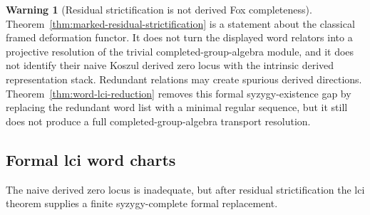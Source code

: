 \documentclass[11pt]{article}
\theoremstyle{definition}
\newtheorem{warning}[theorem]{Warning}
\begin{document}
\begin{warning}[Residual strictification is not derived Fox completeness]\label{warn:q2-marked-not-resolution}
Theorem~\ref{thm:marked-residual-strictification} is a statement about the classical framed deformation functor.  It does not turn the displayed word relators into a projective resolution of the trivial completed-group-algebra module, and it does not identify their naive Koszul derived zero locus with the intrinsic derived representation stack.  Redundant relations may create spurious derived directions.  Theorem~\ref{thm:word-lci-reduction} removes this formal syzygy-existence gap by replacing the redundant word list with a minimal regular sequence, but it still does not produce a full completed-group-algebra transport resolution.
\end{warning}

\subsection{Formal lci word charts}\label{subsec:word-lci-reduction}

The naive derived zero locus is inadequate, but after residual strictification the lci theorem supplies a finite syzygy-complete formal replacement.
\end{document}

